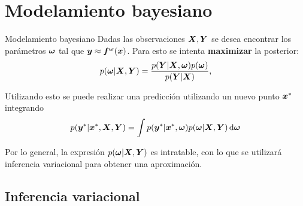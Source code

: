 
\section{Modelamiento bayesiano}

\begin{frame}{Modelamiento bayesiano}
    Dadas las observaciones ${\bm{X}}, {\bm{Y}}$ se desea encontrar los parámetros ${\bm{\omega}}$ tal que ${\bm{y}} \approx {\bm{f}}^{{\bm{\omega}}}({\bm{x}})$. Para esto se intenta \textbf{maximizar} la posterior:
    \begin{equation}
        p({\bm{\omega}}|{\bm{X}},{\bm{Y}}) = \dfrac{p({\bm{Y}}|{\bm{X}},{\bm{\omega}})p({\bm{\omega}})}{p({\bm{Y}}|{\bm{X}})},
    \end{equation}
    
    Utilizando esto se puede realizar una predicción utilizando un nuevo punto ${\bm{x}}^*$ integrando
    \begin{equation}
        p(\by^* | \bx^*, \bX, \bY) = \int p(\by^* | \bx^*, \bomega) p(\bomega | \bX, \bY) \dif \bomega
    \end{equation}
    
    Por lo general, la expresión $p({\bm{\omega}}|{\bm{X}},{\bm{Y}})$ es intratable, con lo que se utilizará inferencia variacional para obtener una aproximación.
    
    
    
\end{frame}

\subsection{Inferencia variacional}

